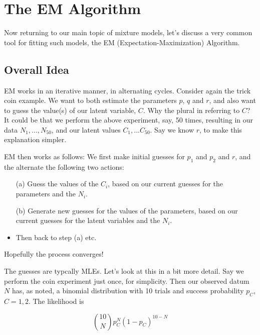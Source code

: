 \section{The EM Algorithm}
\label{emalg}

Now returning to our main topic of mixture models, let's discuss a very
common tool for fitting such models, the EM (Expectation-Maximization)
Algorithm.  

\subsection{Overall Idea}

EM works in an iterative manner, in alternating cycles.  Consider again
the trick coin example.  We want to both estimate the parameters $p$,
$q$ and $r$, and also want to guess the value(s) of our latent variable,
$C$.  Why the plural in referring to $C$?  It could be that we perform
the above experiment, say, 50 times, resulting in our data
$N_1,...,N_{50}$, and our latent values $C_1,...C_{50}$.  
Say we know $r$, to make this explanation simpler.

EM then works as follows:  We first make initial guesses for $p_1$ and $p_2$
and $r$, and the alternate the following two actions:

\begin{itemize}

\item[(a)] Guess the values of the $C_i$, based on our current guesses for
the parameters and the $N_i$.

\item[(b)] Generate new guesses for the values of the parameters, based on
our current guesses for the latent variables and the $N_i$.

\item Then back to step (a) etc.

\end{itemize} 

Hopefully the process converges!

The guesses are typcally MLEs.  Let's look at this in a bit more detail.
Say we perform the coin experiment just once, for simplicity.  Then our
observed datum $N$ has, as noted, a binomial distribution with 10 trials
and success probability $p_C$, $C = 1,2$.  The likelihood is

\begin{equation}
\label{binlikeA}
\binom{10}{N} p_C^N (1-p_C)^{10-N}
\end{equation}

